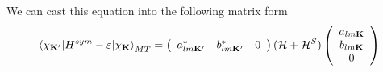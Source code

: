 \documentclass[aps,prb,floatfix,epsfig,singlecolumn,showpacs,preprintnumbers]{revtex4}
\newcommand{\vK}{{\mathbf{K}}}
\newcommand{\cH}{{\cal H}}
\begin{document}
We can cast this equation into the following matrix form
\begin{eqnarray}
\braket{\chi_{\vK'}|H^{sym}-\varepsilon|\chi_\vK}_{MT}=
\left(
\begin{array}{ccc}
a_{lm\vK'}^* & b_{lm\vK'}^* & 0
\end{array}
\right)
(\cH+\cH^S)
\left(
\begin{array}{c}
a_{lm\vK}\\
b_{lm\vK}\\
0
\end{array}
\right)
\end{eqnarray}
\end{document}
